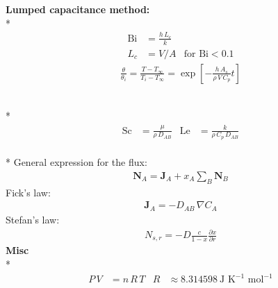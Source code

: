 \begin{datasheet}
{\bf Lumped capacitance method:}\\*
\begin{align*}
  \text{Bi} &= \frac{h\,L_c}{k} & \\
  L_c &= 
  V/A & \text{for $\text{Bi}<0.1$}
\end{align*}
\begin{align*}
  \frac{\theta}{\theta_i} = \frac{T-T_\infty}{T_i-T_\infty} = \exp\left[-\frac{h\,A_s}{\rho\,V\,C_p}t\right]
\end{align*}

\\*
\begin{align*}
  \text{Sc} &= \frac{\mu}{\rho\,D_{AB}} & \text{Le} &= \frac{k}{\rho\,C_p\,D_{AB}}
\end{align*}
\\*
General expression for the flux:
\begin{align*}
  \bm{N}_{A} = \bm{J}_A + x_A \sum_B \bm{N}_B
\end{align*}
Fick's law:
\begin{align*}
  \bm{J}_{A} = - D_{AB}\,\nabla C_A
\end{align*}
Stefan's law:
\begin{align*}
  N_{s,r} = -D \frac{c}{1-x}\frac{\partial x}{\partial r}
\end{align*}
{\bf Misc}\\*
\begin{align*}
  P\,V &= n\,R\,T & 
  R&\approx8.314598~\text{J K}^{-1}\text{ mol}^{-1} 
\end{align*}
\end{datasheet}
